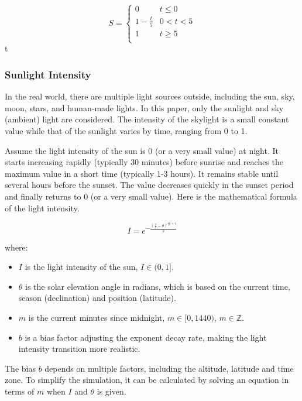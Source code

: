 \documentclass{article}
\begin{document}
\[
  S=
  \left\{
    \begin{array}{ll}
      0 & t\leq 0 \\
      1 - \frac{t}{5} &  0 < t < 5 \\
      1 & t\geq 5 \\
    \end{array} 
  \right. 
\]
 t 

\subsubsection {Sunlight Intensity}
In the real world, there are multiple light sources outside, including the sun, sky, moon, stars, 
and human-made lights. In this paper, only the sunlight and sky (ambient) light are considered. 
The intensity of the skylight is a small constant value while that of the sunlight varies by 
time, ranging from 0 to 1.

Assume the light intensity of the sun is 0 (or a very small value) at night. It starts increasing 
rapidly (typically 30 minutes) before sunrise and reaches the maximum value in a short time 
(typically 1-3 hours). It remains stable until several hours before the sunset. The value 
decreases quickly in the sunset period and finally returns to 0 (or a very small value). Here is 
the mathematical formula of the light intensity.

\[
  I = e^{-\frac{\left(\frac{\pi}{2} - \theta\right)^{\frac{m}{60} + 1}}{b}}
\]

where:
\begin{itemize}
  \item \( I \) is the light intensity of the sun, \( I \in (0, 1] \).
  \item \( \theta \) is the solar elevation angle in radians, which is based on the current time, 
  season (declination) and position (latitude).
  \item \( m \) is the current minutes since midnight, \( m \in [0, 1440) \), \( m \in \mathbb{Z} \).
  \item \( b \) is a bias factor adjusting the exponent decay rate, making the light intensity
  transition more realistic.
\end{itemize}

The bias \( b \) depends on multiple factors, including the altitude, latitude and time zone. To
simplify the simulation, it can be calculated by solving an equation in terms of \( m \) when 
\( I \) and \( \theta\) is given.
\end{document}
